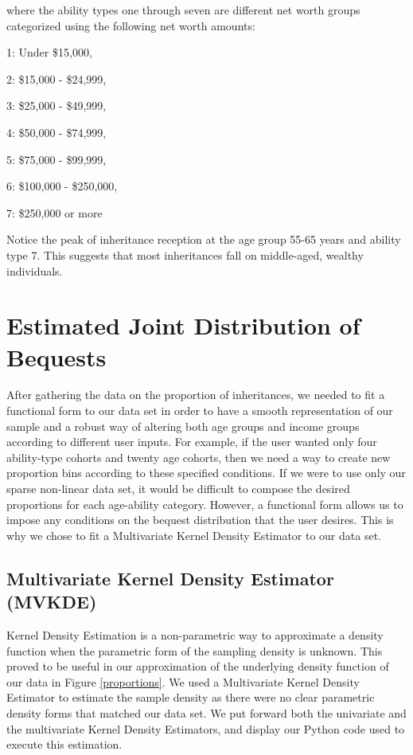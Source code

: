 \documentclass[letterpaper,12pt]{article}
\theoremstyle{definition}
\begin{document}
\begin{spacing}{1.5}
where the ability types one through seven are different net worth groups categorized using the following
net worth amounts:

1: Under \$15,000,

2: \$15,000 - \$24,999,

3: \$25,000 - \$49,999,

4: \$50,000 - \$74,999,

5: \$75,000 - \$99,999,

6: \$100,000 - \$250,000,

7: \$250,000 or more

Notice the peak of inheritance reception at the age group 55-65 years and ability type 7. This suggests that most inheritances fall on middle-aged, wealthy individuals.

\section{Estimated Joint Distribution of Bequests}\label{SecDist}

  After gathering the data on the proportion of inheritances, we needed to fit a functional form to our data set in order to have a smooth representation of our sample and a robust way of altering both age groups and income groups according to different user inputs. For example, if the user wanted only four ability-type cohorts and twenty age cohorts, then we need a way to create new proportion bins according to these specified conditions. If we were to use only our sparse non-linear data set, it would be difficult to compose the desired proportions for each age-ability category. However, a functional form allows us to impose any conditions on the bequest distribution that the user desires. This is why we chose to fit a Multivariate Kernel Density Estimator to our data set. 


  \subsection{Multivariate Kernel Density Estimator (MVKDE)}\label{SecDistMVKDE}


    Kernel Density Estimation is a non-parametric way to approximate a density function when the parametric form of the sampling density is unknown. This proved to be useful in our approximation of the underlying density function of our data in Figure \ref{proportions}. We used a Multivariate Kernel Density Estimator to estimate the sample density as there were no clear parametric density forms that matched our data set. We put forward both the univariate and the multivariate Kernel Density Estimators, and display our Python code used to execute this estimation.


\end{spacing}
\end{document}
